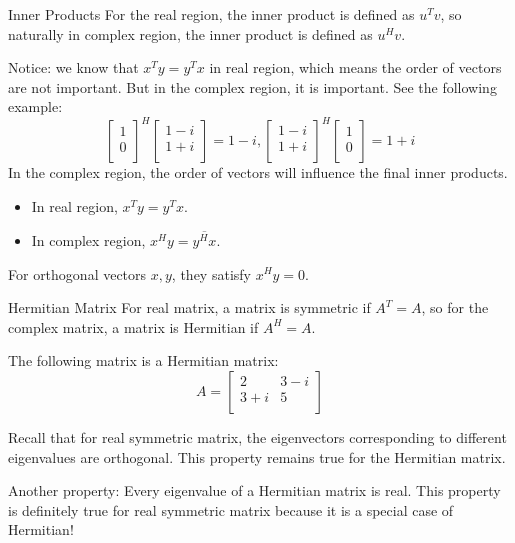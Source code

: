 \documentclass{beamer}
\begin{document}
\begin{frame}{Inner Products}
For the real region, the inner product is defined as $u^Tv$, so naturally in complex region, the inner product is defined as $u^Hv$.

\vspace{3pt}
Notice: we know that $x^Ty=y^Tx$ in real region, which means the order of vectors are not important. But in the complex region, it is important.
See the following example:
\begin{equation*}
    \left[ \begin{array}{c}
        1\\
        0\\
    \end{array} \right] ^H\left[ \begin{array}{c}
        1-i\\
        1+i\\
    \end{array} \right] =1-i, \left[ \begin{array}{c}
        1-i\\
        1+i\\
    \end{array} \right] ^H\left[ \begin{array}{c}
        1\\
        0\\
    \end{array} \right] =1+i
\end{equation*}
In the complex region, the order of vectors will influence the final inner products.
\begin{itemize}
    \item In real region, $x^Ty=y^Tx$.
    \item In complex region, $x^Hy=\overline{y^Hx}$.
\end{itemize}
For orthogonal vectors $x, y$, they satisfy $x^Hy=0$.
\end{frame}

\begin{frame}{Hermitian Matrix}
For real matrix, a matrix is symmetric if $A^T=A$, so for the complex matrix, a matrix is Hermitian if $A^H=A$.

\vspace{3pt}
The following matrix is a Hermitian matrix:
\begin{equation*}
    A=\left[ \begin{matrix}
        2&		3-i\\
        3+i&		5\\
    \end{matrix} \right]
\end{equation*}

Recall that for real symmetric matrix, the eigenvectors corresponding to different eigenvalues are orthogonal. This property remains true for the Hermitian matrix.

\vspace{3pt}
Another property: Every eigenvalue of a Hermitian matrix is real. This property is definitely true for real symmetric matrix because it is a special case of Hermitian!


\end{frame}
\end{document}
